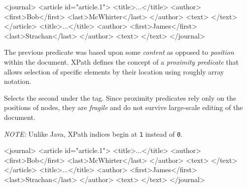 \documentclass[20pt,landscape,headrule,footrule]{foils}
\begin{document}
\begin{codelisting}
<journal>
    <article id="article.1">
        <title>...</title>
        <author>
          <first>Bob</first>
          <last>McWhirter</last>
        </author>
        <text>
        </text>
    </article>
        <title>...</title>
        <author>
          <first>James</first>
          <last>Strachan</last>
        </author>
        <text>
        </text>
</journal>
\end{codelisting}



The previous predicate was based upon some \emph{content} as opposed
to \emph{position} within the document.  XPath defines the concept
of a \emph{proximity predicate} that allows selection of specific
elements by their location using roughly array notation.  


Selects the second  under the  tag.  Since
proximity predicates rely only on the positions of nodes, they are
\emph{fragile} and do not survive large-scale editing of the
document.

\emph{NOTE:} Unlike Java, XPath indices begin at \texttt{1} instead
of \texttt{0}.




\begin{codelisting}
<journal>
    <article id="article.1">
        <title>...</title>
        <author>
          <first>Bob</first>
          <last>McWhirter</last>
        </author>
        <text>
        </text>
    </article>
        <title>...</title>
        <author>
          <first>James</first>
          <last>Strachan</last>
        </author>
        <text>
        </text>
</journal>
\end{codelisting}

\end{document}
